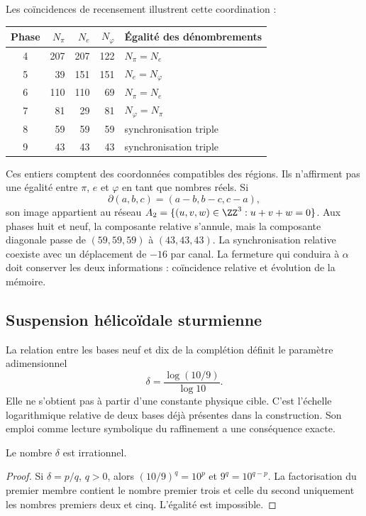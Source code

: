 Les coïncidences de recensement illustrent cette coordination :
\begin{center}
\begin{tabular}{@{}c rrr l@{}}\toprule
Phase&\(N_\pi\)&\(N_e\)&\(N_\varphi\)&Égalité des dénombrements\\\midrule
4&207&207&122&\(N_\pi=N_e\)\\
5&39&151&151&\(N_e=N_\varphi\)\\
6&110&110&69&\(N_\pi=N_e\)\\
7&81&29&81&\(N_\varphi=N_\pi\)\\
8&59&59&59&synchronisation triple\\
9&43&43&43&synchronisation triple\\\bottomrule
\end{tabular}
\end{center}
Ces entiers comptent des coordonnées compatibles des régions. Ils n'affirment pas une égalité entre \(\pi\), \(e\) et \(\varphi\) en tant que nombres réels. Si
\[
 \partial(a,b,c)=(a-b,b-c,c-a),
\]
son image appartient au réseau \(A_2=\{(u,v,w)\in\ZZ^3:u+v+w=0\}\). Aux phases huit et neuf, la composante relative s'annule, mais la composante diagonale passe de \((59,59,59)\) à \((43,43,43)\). La synchronisation relative coexiste avec un déplacement de \(-16\) par canal. La fermeture qui conduira à \(\alpha\) doit conserver les deux informations : coïncidence relative et évolution de la mémoire.

\subsection{Suspension hélicoïdale sturmienne}

La relation entre les bases neuf et dix de la complétion définit le paramètre adimensionnel
\begin{equation}
 \delta=\frac{\log(10/9)}{\log10}.
 \label{eq:delta-sturm}
\end{equation}
Elle ne s'obtient pas à partir d'une constante physique cible. C'est l'échelle logarithmique relative de deux bases déjà présentes dans la construction. Son emploi comme lecture symbolique du raffinement a une conséquence exacte.

\begin{lemma}
Le nombre \(\delta\) est irrationnel.
\end{lemma}
\begin{proof}
Si \(\delta=p/q\), \(q>0\), alors \((10/9)^q=10^p\) et \(9^q=10^{q-p}\). La factorisation du premier membre contient le nombre premier trois et celle du second uniquement les nombres premiers deux et cinq. L'égalité est impossible.
\end{proof}

